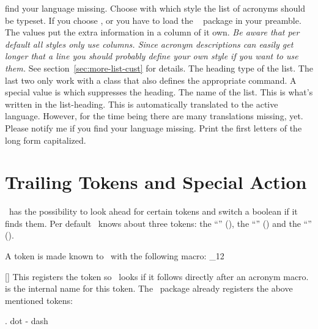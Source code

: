 \documentclass[load-preamble+]{cnltx-doc}
\makeatletter
\renewenvironment{commands}
  {%
    \cnltx@set@catcode_{12}%
    \let\command\cnltx@command
    \cnltxlist
  }
  {\endcnltxlist}
\makeatother
\begin{document}
\begin{options}
    find your language missing.
    Choose with which style the list of acronyms should be
    typeset.  If you choose ,  or
     you have to load the
    ~\cite{pkg:longtable} package in your preamble.  The values
     put the extra information in a column of it
    own.  \emph{Be aware that per default \emph{all}  styles
      only use  columns.  Since acronym descriptions can easily get
      longer that a line you should probably define your own style if you want
      to use them.}  See section~\vref{sec:more-list-cust} for details.
    The heading type of the list. The last two only work
    with a \KOMAScript{} class that also defines the appropriate command.  A
    special value is  which suppresses the heading.
    The name of the list.  This is what's written in the list-heading.  This
    is automatically translated to the active language.  However, for the time
    being there are many translations missing, yet.  Please notify me if you
    find your language missing.
    Print the first letters of the long form capitalized.
\end{options}

\section{Trailing Tokens and Special Action}

\acro\ has the possibility to look ahead for certain tokens
and switch a boolean if it finds them.  Per default \acro\ knows about three
tokens: the \enquote{} (), the \enquote{}
(\code{-}) and the \enquote{} ().

A token is made known to \acro\ with the following macro:
\begin{commands}
  \command{AcroRegisterTrailing}[]
    This registers the token  so \acro\ looks if it follows
    directly after an acronym macro.   is the internal name for
    this token.
\end{commands}
The \acro\ package already registers the above mentioned tokens:
\begin{sourcecode}
  \AcroRegisterTrailing . {dot}
  \AcroRegisterTrailing - {dash}
  \AcroRegisterTrailing {}
\end{sourcecode}
\end{document}
